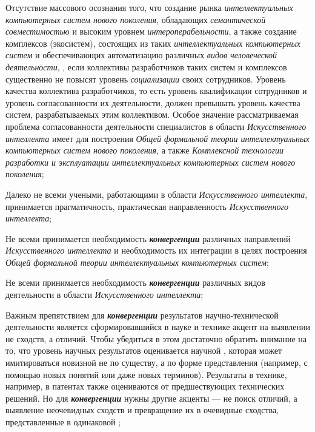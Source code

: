 \begin{textitemize}
	\item
	Отсутствие массового осознания того, что создание рынка \textit{интеллектуальных компьютерных систем нового поколения}, обладающих \textit{семантической совместимостью} и высоким уровнем \textit{интероперабельности}, а также создание комплексов (экосистем), состоящих из таких \textit{интеллектуальных компьютерных систем} и обеспечивающих автоматизацию различных \textit{видов человеческой деятельности}, , если коллективы разработчиков таких систем и комплексов существенно не повысят уровень \textit{социализации} \textbf{} своих сотрудников. Уровень качества коллектива разработчиков, то есть уровень квалификации сотрудников и уровень согласованности их деятельности, должен превышать уровень качества систем, разрабатываемых этим коллективом. Особое значение рассматриваемая проблема согласованности деятельности специалистов в области \textit{Искусственного интеллекта} имеет для построения \textit{Общей формальной теории интеллектуальных компьютерных систем нового поколения}, а также \textit{Комплексной технологии разработки и эксплуатации интеллектуальных компьютерных систем нового поколения};
	\item
	Далеко не всеми учеными, работающими в области \textit{Искусственного интеллекта}, принимается прагматичность, практическая направленность \textit{Искусственного интеллекта};
	\item
	Не всеми принимается необходимость \textbf{\textit{конвергенции}} различных направлений \textit{Искусственного интеллекта} и необходимость их интеграции в целях построения \textit{Общей формальной теории интеллектуальных компьютерных систем};
	\item
	Не всеми принимается необходимость \textbf{\textit{конвергенции}} различных видов деятельности в области \textit{Искусственного интеллекта};
	\item
	Важным препятствием для \textbf{\textit{конвергенции}} результатов научно-технической деятельности является сформировавшийся в науке и технике акцент на выявлении не сходств, а отличий. Чтобы убедиться в этом достаточно обратить внимание на то, что уровень научных результатов оценивается научной , которая может имитироваться новизной не по существу, а по форме представления (например, с помощью новых понятий или даже новых терминов). Результаты в технике, например, в патентах также оцениваются  от предшествующих технических решений. Но для \textbf{\textit{конвергенции}} нужны другие акценты --- не поиск отличий, а выявление неочевидных сходств и превращение их в очевидные сходства, представленные в одинаковой ;

\end{textitemize}

